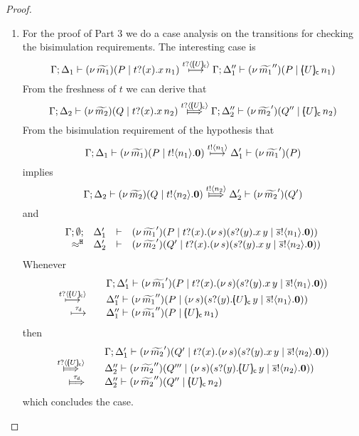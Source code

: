 \begin{proof}
\begin{enumerate}[1.]
		\item	For the proof of Part 3 we do a case analysis on the transitions for checking the bisimulation requirements. The interesting case is
				\[
					\Gamma; \Delta_1 \proves \newsp{\widetilde{m_1}}{P \Par \binp{t}{x} \appl{x}{n_1}}
					\hby{\bactinp{t}{\omapchar{U}}} 
					\Gamma; \Delta_1'' \proves \newsp{\widetilde{m_1}''}{P \Par \appl{\omapchar{U}}{n_1}}
				\]
				From the freshness of $t$ we can derive that
				\[
					\Gamma; \Delta_2 \proves \newsp{\widetilde{m_2}}{Q \Par \binp{t}{x} \appl{x}{n_2}}
					\Hby{\bactinp{t}{\omapchar{U}}} 
					\Gamma; \Delta_2'' \proves \newsp{\widetilde{m_2}'}{Q'' \Par \appl{\omapchar{U}}{n_2}}
				\]
				From the bisimulation requirement of the hypothesis that
				\[
					\Gamma; \Delta_1 \vdash  (\nu\, \widetilde{m_1})(P \;|\; t ! \langle n_1 \rangle . \mathbf{0})  \stackrel{t ! \langle n_1 \rangle }{\longmapsto} \Delta_1' \vdash  (\nu\, \widetilde{m_1}')(P)
				\]
				implies
				\[
					\horel{\Gamma}{\Delta_2}{ \newsp{\widetilde{m_2}}{Q \Par \bout{t}{n_2} \inact} }
					{\Hby{\bactout{t}{n_2} }}
					{\Delta_2'}{ \newsp{\widetilde{m_2}'}{Q'} }
				\]
				and
				\[
					\begin{array}{rcll} \Gamma; \emptyset; &\Delta_1'& \vdash&  (\nu\, \widetilde{m_1}')(P \;|\; t ? (x) . (\nu\, s)( s ? (y) . x\, {y} \;|\; \overline{s} ! \langle n_1 \rangle . \mathbf{0} ) ) \\ \approx^\mathtt{H} &\Delta_2'& \vdash &   (\nu\, \widetilde{m_2}')(Q' \;|\; t ? (x) . (\nu\, s)( s ? (y) . x\, {y} \;|\; \overline{s} ! \langle n_2 \rangle . \mathbf{0} ))  \end{array}
				\]
				Whenever
				\[
				\begin{array}{rcl}
					&& \Gamma; \Delta_1' \proves \newsp{\widetilde{m_1}'}{P \Par \binp{t}{x} \newsp{s}{ \binp{s}{y} \appl{x}{y} \Par \bout{\dual{s}}{n_1} \inact}}\\ 
					\hby{\bactinp{t}{\omapchar{U}}}&& 
					\Delta_1'' \proves \newsp{\widetilde{m_1}''}{P \Par \newsp{s}{ \binp{s}{y} \appl{\omapchar{U}}{y} \Par \bout{\dual{s}}{n_1} \inact }}
					\\
					\hby{\dtau} &&
					\Delta_1'' \proves \newsp{\widetilde{m_1}''}{P \Par \appl{\omapchar{U}}{n_1}}
				\end{array}
				\]
				then
				\[
				\begin{array}{rcl}
					&&\Gamma; \Delta_1' \proves \newsp{\widetilde{m_2}'}{Q' \Par \binp{t}{x} \newsp{s}{ \binp{s}{y} \appl{x}{y} \Par \bout{\dual{s}}{n_2} \inact } }
					\\
					\Hby{\bactinp{t}{\omapchar{U}}} &&
					\Delta_2'' \proves \newsp{\widetilde{m_2}''}{Q''' \Par \newsp{s}{ \binp{s}{y} \appl{\omapchar{U}}{y} \Par \bout{\dual{s}}{n_2} \inact }}
					\\
					\Hby{\dtau} &&
					\Delta_2'' \proves \newsp{\widetilde{m_2}''}{Q'' \Par \appl{\omapchar{U}}{n_2}}
				\end{array}
				\]
				which concludes the case.
				

\end{enumerate}
\end{proof}
